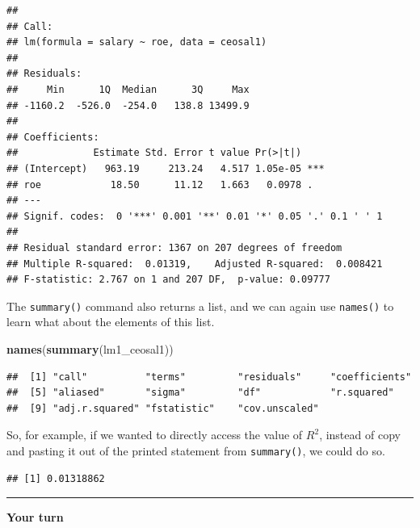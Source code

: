 \documentclass[]{book}
\newenvironment{Shaded}{\begin{snugshade}}{\end{snugshade}}
\newcommand{\KeywordTok}[1]{\textcolor[rgb]{0.13,0.29,0.53}{\textbf{#1}}}
\newcommand{\NormalTok}[1]{#1}
\newcommand{\OperatorTok}[1]{\textcolor[rgb]{0.81,0.36,0.00}{\textbf{#1}}}
\begin{document}
\begin{verbatim}
## 
## Call:
## lm(formula = salary ~ roe, data = ceosal1)
## 
## Residuals:
##     Min      1Q  Median      3Q     Max 
## -1160.2  -526.0  -254.0   138.8 13499.9 
## 
## Coefficients:
##             Estimate Std. Error t value Pr(>|t|)    
## (Intercept)   963.19     213.24   4.517 1.05e-05 ***
## roe            18.50      11.12   1.663   0.0978 .  
## ---
## Signif. codes:  0 '***' 0.001 '**' 0.01 '*' 0.05 '.' 0.1 ' ' 1
## 
## Residual standard error: 1367 on 207 degrees of freedom
## Multiple R-squared:  0.01319,    Adjusted R-squared:  0.008421 
## F-statistic: 2.767 on 1 and 207 DF,  p-value: 0.09777
\end{verbatim}

The \texttt{summary()} command also returns a list, and we can again use
\texttt{names()} to learn what about the elements of this list.

\begin{Shaded}
\begin{Highlighting}[]
\KeywordTok{names}\NormalTok{(}\KeywordTok{summary}\NormalTok{(lm1_ceosal1))}
\end{Highlighting}
\end{Shaded}

\begin{verbatim}
##  [1] "call"          "terms"         "residuals"     "coefficients" 
##  [5] "aliased"       "sigma"         "df"            "r.squared"    
##  [9] "adj.r.squared" "fstatistic"    "cov.unscaled"
\end{verbatim}

So, for example, if we wanted to directly access the value of \(R^2\),
instead of copy and pasting it out of the printed statement from
\texttt{summary()}, we could do so.

\begin{Shaded}
\end{Shaded}

\begin{verbatim}
## [1] 0.01318862
\end{verbatim}

\begin{center}\rule{0.5\linewidth}{\linethickness}\end{center}

\textbf{Your turn}
\end{document}
